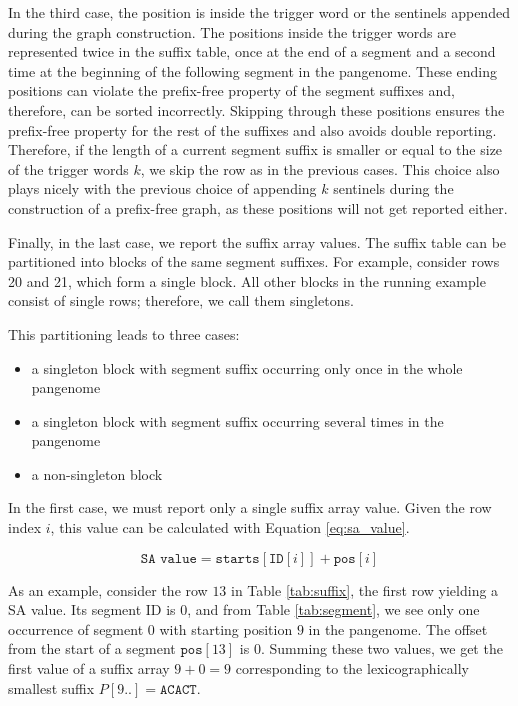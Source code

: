 In the third case, the position is inside the trigger word or the sentinels appended during the graph construction.
The positions inside the trigger words are represented twice in the suffix table, once at the end of a segment and a second time at the beginning of the following segment in the pangenome.
These ending positions can violate the prefix-free property of the segment suffixes and, therefore, can be sorted incorrectly.
Skipping through these positions ensures the prefix-free property for the rest of the suffixes and also avoids double reporting.
Therefore, if the length of a current segment suffix is smaller or equal to the size of the trigger words $k$, we skip the row as in the previous cases.
This choice also plays nicely with the previous choice of appending $k$ sentinels during the construction of a prefix-free graph, as these positions will not get reported either.

Finally, in the last case, we report the suffix array values.
The suffix table can be partitioned into blocks of the same segment suffixes.
For example, consider rows 20 and 21, which form a single block.
All other blocks in the running example consist of single rows; therefore, we call them singletons.

This partitioning leads to three cases:
\begin{itemize}
    \item a singleton block with segment suffix occurring only once in the whole pangenome
    \item a singleton block with segment suffix occurring several times in the pangenome
    \item a non-singleton block
\end{itemize}

In the first case, we must report only a single suffix array value.
Given the row index $i$, this value can be calculated with Equation \ref{eq:sa_value}.

\begin{equation}
    \label{eq:sa_value}
    \texttt{SA value} = \texttt{starts}[\texttt{ID}[i]] + \texttt{pos}[i]
\end{equation}

As an example, consider the row $13$ in Table \ref{tab:suffix}, the first row yielding a SA value.
Its segment ID is $0$, and from Table \ref{tab:segment}, we see only one occurrence of segment $0$ with starting position $9$ in the pangenome.
The offset from the start of a segment $\texttt{pos}[13]$ is $0$.
Summing these two values, we get the first value of a suffix array $9 + 0 = 9$ corresponding to the lexicographically smallest suffix $P[9..] = \texttt{ACACT}$.

